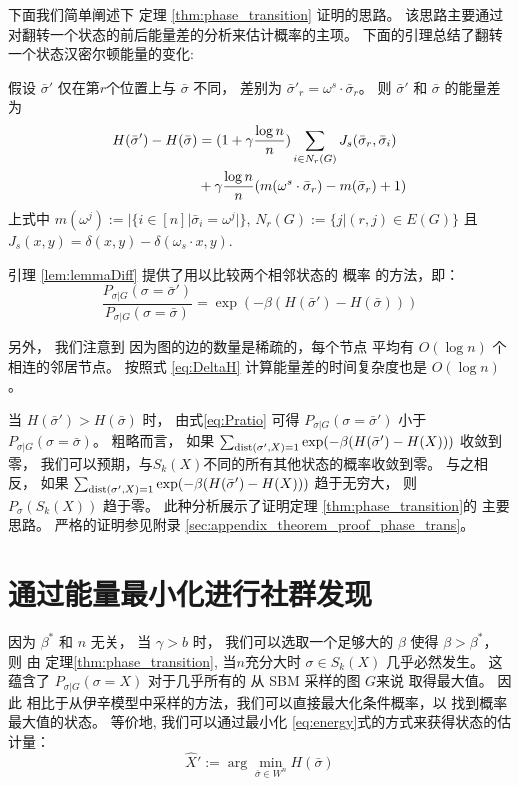 下面我们简单阐述下 定理 \ref{thm:phase_transition} 证明的思路。
该思路主要通过对翻转一个状态的前后能量差的分析来估计概率的主项。
下面的引理总结了翻转一个状态汉密尔顿能量的变化:
\begin{lemma}\label{lem:lemmaDiff}
	假设 $\bar{\sigma}'$ 仅在第$r$个位置上与 $\bar{\sigma}$ 不同，
	差别为 $\bar{\sigma}'_r = \omega^s \cdot \bar{\sigma}_r$。
	则 $\bar{\sigma}'$ 和 $\bar{\sigma}$ 的能量差为
\begin{align}
	H(\bar{\sigma}') - H(\bar{\sigma}) &= (1+\gamma \frac{\log n}{n})\sum_{i \in N_r(G)} J_s(\bar{\sigma}_r, \bar{\sigma}_i)
	\notag \\
	&+ \gamma \frac{\log n}{n} (m(\omega^s \cdot \bar{\sigma}_r)-m(\bar{\sigma}_r)+1) \label{eq:DeltaH}
	\end{align}
	上式中 $m(\omega^j) := |\{i \in [n] | \bar{\sigma}_i = \omega^j | \}$, $N_r(G):=\{j | (r, j) \in E(G) \}$ 且 $J_s(x, y) = \delta(x, y) - \delta(\omega_s \cdot x, y)$.
\end{lemma}
引理 \ref{lem:lemmaDiff} 提供了用以比较两个相邻状态的    概率
的方法，即：
\begin{equation}\label{eq:Pratio}
\frac{P_{\sigma |G } (\sigma = \bar{\sigma}')}{P_{\sigma |G } (\sigma = \bar{\sigma})}
= \exp(-\beta(H(\bar{\sigma}') - H(\bar{\sigma})))
\end{equation}

另外， 我们注意到 因为图的边的数量是稀疏的，每个节点
平均有 $O(\log n)$ 个相连的邻居节点。
按照式 \eqref{eq:DeltaH} 
计算能量差的时间复杂度也是 $O(\log n)$。

当 $H(\bar{\sigma}') > H(\bar{\sigma})$ 时， 
由式\eqref{eq:Pratio} 可得
$P_{\sigma | G}(\sigma = \bar{\sigma}')$
小于
$P_{\sigma | G}(\sigma = \bar{\sigma})$。
粗略而言， 如果
$ \sum_{\operatorname{dist}(\sigma', X)=1}\exp(-\beta(H(\bar{\sigma}') - H(X))) $
收敛到零，
我们可以预期，与$S_k(X)$不同的所有其他状态的概率收敛到零。
与之相反， 如果
$ \sum_{\operatorname{dist}(\sigma', X)=1}\exp(-\beta(H(\bar{\sigma}') - H(X))) $
趋于无穷大，
则 $P_{\sigma}(S_k(X))$ 趋于零。
此种分析展示了证明定理 \ref{thm:phase_transition}的
主要思路。
严格的证明参见附录 \ref{sec:appendix_theorem_proof_phase_trans}。

\section{通过能量最小化进行社群发现}\label{sec:em}
因为 $\beta^*$ 和 $n$ 无关，
当 $\gamma>b$ 时，
我们可以选取一个足够大的 $\beta$ 使得
$\beta > \beta^*$，
则 由 定理\ref{thm:phase_transition}, 当$n$充分大时 $\sigma \in S_k(X)$ 几乎必然发生。
这蕴含了 $P_{\sigma | G}(\sigma = X)$
对于几乎所有的 从 SBM 采样的图  $G$来说 取得最大值。
因此
相比于从伊辛模型中采样的方法，我们可以直接最大化条件概率，以
找到概率最大值的状态。
等价地, 我们可以通过最小化 \eqref{eq:energy}式的方式来获得状态的估计量：
\begin{equation}\label{eq:hatX}
\hat{X}' := \arg\min_{\bar{\sigma} \in W^n} H(\bar{\sigma})
\end{equation}


